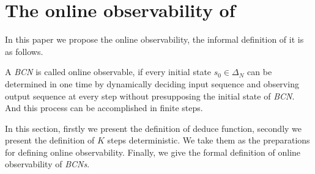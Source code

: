 \section{The online observability of \BCNs}
\label{sec:online}
In this paper we propose the online observability, the informal definition of it is as follows. 

\begin{definition}
	A {\em BCN} is called online observable, if every initial state $s_0 \in \Delta_N$ can be determined in one time by dynamically deciding input sequence and observing output sequence at every step without presupposing the  initial state of {\em BCN}. And this process can be accomplished in finite steps.
\end{definition}


In this section, firstly we present the definition of deduce function, secondly we present the definition of $K$ steps deterministic. We take them as the preparations for defining online observability. Finally, we give the formal definition of online observability of {\em BCNs}. 
